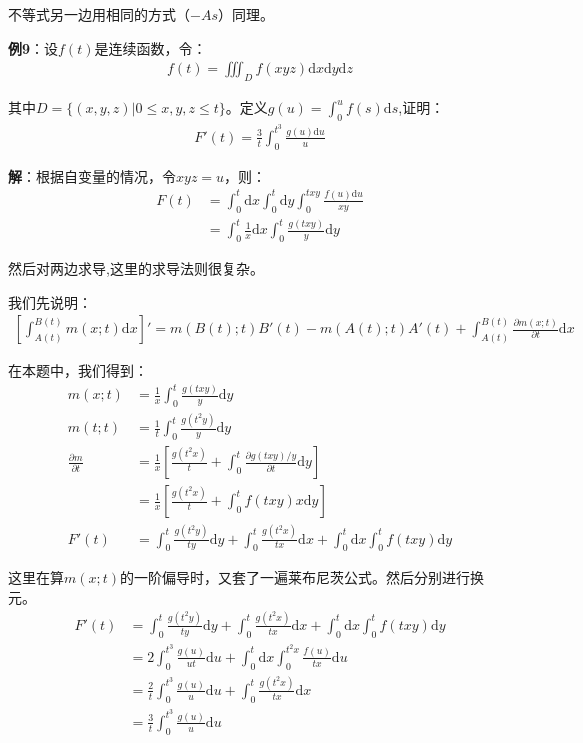 \documentclass{ctexart}
\let\oldtextbf\textbf
\renewcommand{\textbf}[1]{\textcolor{brown!50!red}{\oldtextbf{#1}}}
\begin{document}
不等式另一边用相同的方式（$-As$）同理。

\textbf{\color{brown!50!red}例9}：设$f(t)$是连续函数，令：
\begin{align*} 
f(t)=\iiint_D f(xyz)\mathrm{d}x\mathrm{d}y\mathrm{d}z 
\end{align*}

其中$D=\{(x,y,z)| 0\leq x,y,z \leq t\}$。定义$g(u)=\int_0^u f(s)\mathrm{d}s$,证明：
\begin{align*} 
F'(t)=\frac{3}{t}\int_0^{t^3}\frac{g(u)\mathrm{d}u}{u}  
\end{align*}

\textbf{\color{brown!50!red}解}：根据自变量的情况，令$xyz=u$，则：
\begin{align*} 
F(t)&=\int_0^t\mathrm{d}x\int_0^t\mathrm{d}y\int_0^{txy}\frac{f(u)\mathrm{d}u}{xy}\\
   &=\int_0^t\frac{1}{x} \mathrm{d}x\int_0^t\frac{g(txy)}{y} \mathrm{d}y
\end{align*}

然后对两边求导,这里的求导法则很复杂。
\begin{tcolorbox}[
    colback=bac1,     %
    colframe=fra1,   %
    coltitle=white,             %
    coltext=tex1,
    title=莱布尼茨符合求导法则,
    fonttitle=\bfseries,        %
arc=3mm,                     %
breakable
]
我们先说明：
\begin{align*} 
\left[\int_{A(t)}^{B(t)}m(x;t)\mathrm{d}x\right]'=m(B(t);t)B'(t)-m(A(t);t)A'(t)+\int_{A(t)}^{B(t)}\frac{\partial m(x;t)}{\partial t}\mathrm{d}x
\end{align*}
\end{tcolorbox}

在本题中，我们得到：
\begin{align*} 
m(x;t)&=\frac{1}{x} \int_0^t\frac{g(txy)}{y}\mathrm{d}y \\
m(t;t)&=\frac{1}{t}\int_0^t\frac{g(t^2y)}{y}\mathrm{d}y\\
\frac{\partial m}{\partial t}&=\frac{1}{x}[\frac{g(t^2x)}{t}+\int_0^t\frac{\partial g(txy)/y
}{\partial t}\mathrm{d}y ]  \\
&=\frac{1}{x}[\frac{g(t^2x)}{t}+\int_0^t f(txy)x \mathrm{d}y ]
\\F'(t)&=\int_0^t\frac{g(t^2y)}{ty}\mathrm{d}y+\int_0^t\frac{g(t^2x)}{tx}\mathrm{d}x
+\int_0^t\mathrm{d}x\int_0^t f(txy)\mathrm{d}y
\end{align*}

这里在算$m(x;t)$的一阶偏导时，又套了一遍莱布尼茨公式。然后分别进行换元。
\begin{align*} 
F'(t)&=\int_0^t\frac{g(t^2y)}{ty}\mathrm{d}y+\int_0^t\frac{g(t^2x)}{tx}\mathrm{d}x
+\int_0^t\mathrm{d}x\int_0^t f(txy)\mathrm{d}y\\
&=2\int_0^{t^3}\frac{g(u)}{ut}\mathrm{d}u+\int_0^t\mathrm{d}x \int_0^{t^2x}\frac{f(u)}{tx}\mathrm{d}u\\
&= \frac{2}{t}\int_0^{t^3}\frac{g(u)}{u}\mathrm{d}u+\int_0^t \frac{g(t^2x)}{tx}\mathrm{d}x\\
&=\frac{3}{t}\int_0^{t^3}\frac{g(u)}{u}\mathrm{d}u 
\end{align*}
\end{document}
